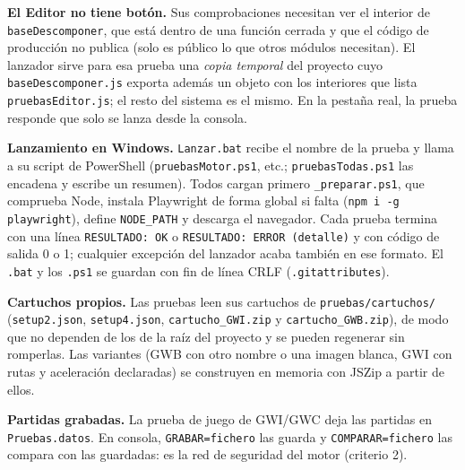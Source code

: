 \textbf{El Editor no tiene botón.} Sus comprobaciones necesitan ver el interior de \texttt{baseDescomponer}, que está dentro de una función cerrada y que el código de producción no publica (solo es público lo que otros módulos necesitan). El lanzador sirve para esa prueba una \emph{copia temporal} del proyecto cuyo \texttt{baseDescomponer.js} exporta además un objeto con los interiores que lista \texttt{pruebasEditor.js}; el resto del sistema es el mismo. En la pestaña real, la prueba responde que solo se lanza desde la consola.

\textbf{Lanzamiento en Windows.} \texttt{Lanzar.bat} recibe el nombre de la prueba y llama a su script de PowerShell (\texttt{pruebasMotor.ps1}, etc.; \texttt{pruebasTodas.ps1} las encadena y escribe un resumen). Todos cargan primero \texttt{\_preparar.ps1}, que comprueba Node, instala Playwright de forma global si falta (\texttt{npm i -g playwright}), define \texttt{NODE\_PATH} y descarga el navegador. Cada prueba termina con una línea \texttt{RESULTADO: OK} o \texttt{RESULTADO: ERROR (detalle)} y con código de salida 0 o 1; cualquier excepción del lanzador acaba también en ese formato. El \texttt{.bat} y los \texttt{.ps1} se guardan con fin de línea CRLF (\texttt{.gitattributes}).

\textbf{Cartuchos propios.} Las pruebas leen sus cartuchos de \texttt{pruebas/cartuchos/} (\texttt{setup2.json}, \texttt{setup4.json}, \texttt{cartucho\_GWI.zip} y \texttt{cartucho\_GWB.zip}), de modo que no dependen de los de la raíz del proyecto y se pueden regenerar sin romperlas. Las variantes (GWB con otro nombre o una imagen blanca, GWI con rutas y aceleración declaradas) se construyen en memoria con JSZip a partir de ellos.

\textbf{Partidas grabadas.} La prueba de juego de GWI/GWC deja las partidas en \texttt{Pruebas.datos}. En consola, \texttt{GRABAR=fichero} las guarda y \texttt{COMPARAR=fichero} las compara con las guardadas: es la red de seguridad del motor (criterio 2).


